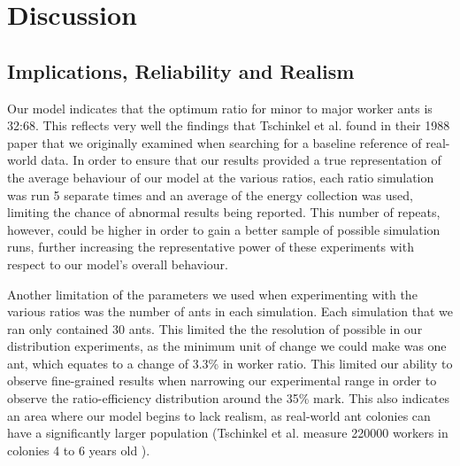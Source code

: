\section{Discussion}



\subsection{Implications, Reliability and Realism}
Our model indicates that the optimum ratio for minor to major worker ants is 32:68. This reflects very well the findings that Tschinkel et al. found in their 1988 paper \cite{Tschinkel1988} that we originally examined when searching for a baseline reference of real-world data. In order to ensure that our results provided a true representation of the average behaviour of our model at the various ratios, each ratio
simulation was run 5 separate times and an average of the energy collection was used, limiting the chance of abnormal results being reported. This number of repeats, however, could be higher in order to gain a better sample of possible simulation runs, further increasing the representative power of these experiments with respect to our model's overall behaviour.

Another limitation of the parameters we used when experimenting with the various ratios was the number of ants in each simulation. Each simulation that we ran only contained 30 ants. This limited the the resolution of possible in our distribution experiments, as the minimum unit of change we could make was one ant, which equates to a change of 3.3\% in worker
ratio. This limited our ability to observe fine-grained results when narrowing our experimental range in order to observe the ratio-efficiency distribution around the 35\% mark. This also indicates an area where our model begins to lack realism, as real-world ant colonies can have a significantly larger population (Tschinkel et al. measure 220000 workers in colonies 4 to 6 years old \cite{Tschinkel1988}).

